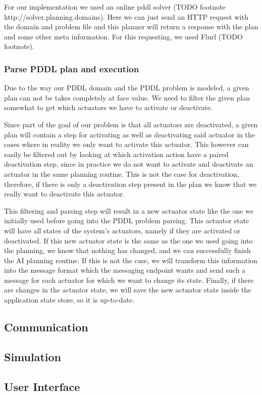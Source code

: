 \documentclass[runningheads]{llncs}
\begin{document}
    For our implementation we used an online pddl solver (TODO footnote http://solver.planning.domains). Here we can just send an HTTP request with the domain and problem file and this planner will return a response with the plan and some other meta information. For this requesting, we used Flurl (TODO footnote).

    \subsubsection{Parse PDDL plan and execution}
    Due to the way our PDDL domain and the PDDL problem is modeled, a given plan can not be takes completely at face value. We need to filter the given plan somewhat to get which actuators we have to activate or deactivate.

    Since part of the goal of our problem is that all actuators are deactivated, a given plan will contain a step for activating as well as deactivating said actuator in the cases where in reality we only want to activate this actuator. This however can easily be filtered out by looking at which activation action have a paired deactivation step, since in practice we do not want to activate and deactivate an actuator in the same planning routine. This is not the case for deactivation, therefore, if there is only a deactivation step present in the plan we know that we really want to deactivate this actuator.

    This filtering and parsing step will result in a new actuator state like the one we initially used before going into the PDDL problem parsing. This actuator state will have all states of the system's actuators, namely if they are activated or deactivated. If this new actuator state is the same as the one we used going into the planning, we know that nothing has changed, and we can successfully finish the AI planning routine. If this is not the case, we will transform this information into the message format which the messaging endpoint wants and send such a message for each actuator for which we want to change its state. Finally, if there are changes in the actuator state, we will save the new actuator state inside the application state store, so it is up-to-date.

    \subsection{Communication}

    \subsection{Simulation}

    \subsection{User Interface}



%
%
%
%

\end{document}
